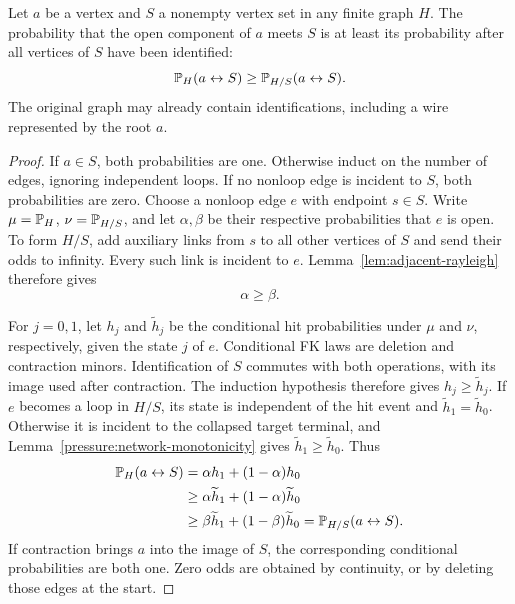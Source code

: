 \begin{lemma}
\label{pressure:general-no-hit}
Let $a$ be a vertex and $S$ a nonempty vertex set in any finite graph
$H$. The probability that the open component of $a$ meets $S$ is at
least its probability after all vertices of $S$ have been identified:
\begin{equation}
 \mathbb P_H(a\leftrightarrow S)
   \ge \mathbb P_{H/S}(a\leftrightarrow S).
 \label{pressure:general-hit-comparison}
\end{equation}
The original graph may already contain identifications, including a
wire represented by the root $a$.
\end{lemma}

\begin{proof}
If $a\in S$, both probabilities are one. Otherwise induct on the
number of edges, ignoring independent loops. If no nonloop edge is
incident to $S$, both probabilities are zero. Choose a nonloop edge
$e$ with endpoint $s\in S$. Write $\mu=\mathbb P_H$, $\nu=\mathbb P_{H/S}$, and
let $\alpha,\beta$ be their respective probabilities that $e$ is open.
To form $H/S$, add auxiliary links from $s$ to all other vertices of
$S$ and send their odds to infinity. Every such link is incident to
$e$. Lemma~\ref{lem:adjacent-rayleigh} therefore gives
\begin{equation}
 \alpha\ge\beta.
 \label{pressure:target-edge-marginal}
\end{equation}

For $j=0,1$, let $h_j$ and $\widetilde h_j$ be the conditional hit
probabilities under $\mu$ and $\nu$, respectively, given the state
$j$ of $e$. Conditional FK laws are deletion and contraction minors.
Identification of $S$ commutes with both operations, with its image
used after contraction. The induction hypothesis therefore gives
$h_j\ge\widetilde h_j$. If $e$ becomes a loop in $H/S$, its state is
independent of the hit event and $\widetilde h_1=\widetilde h_0$.
Otherwise it is incident to the collapsed target terminal, and
Lemma~\ref{pressure:network-monotonicity} gives
$\widetilde h_1\ge\widetilde h_0$. Thus
\begin{align*}
 \mathbb P_H(a\leftrightarrow S)
 &=\alpha h_1+(1-\alpha)h_0\\
 &\ge\alpha\widetilde h_1+(1-\alpha)\widetilde h_0\\
 &\ge\beta\widetilde h_1+(1-\beta)\widetilde h_0
  =\mathbb P_{H/S}(a\leftrightarrow S).
\end{align*}
If contraction brings $a$ into the image of $S$, the corresponding
conditional probabilities are both one. Zero odds are obtained by
continuity, or by deleting those edges at the start.
\end{proof}

